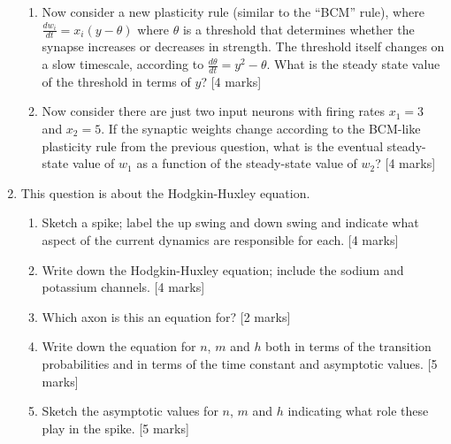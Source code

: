 \documentclass[a4paper,12pt]{article}
\newif\ifsoln
\begin{document}
\begin{enumerate}
\begin{enumerate}
\item Now consider a new plasticity rule (similar to the ``BCM'' rule), where $\frac{dw_i}{dt} = x_i(y-\theta)$ where $\theta$ is a threshold that determines whether the synapse increases or decreases in strength. The threshold itself changes on a slow timescale, according to $\frac{d \theta}{dt} = y^2 - \theta$. What is the steady state value of the threshold in terms of $y$? [4 marks]

\item Now consider there are just two input neurons with firing rates $x_1 = 3$ and $x_2 = 5$. If the synaptic weights change according to the BCM-like plasticity rule from the previous question, what is the eventual steady-state value of $w_1$ as a function of the steady-state value of $w_2$? [4 marks]
\end{enumerate}

\ifsoln Solution:  To follow soon.\fi

\item This question is about the Hodgkin-Huxley equation.

\begin{enumerate}

\item Sketch a spike; label the up swing and down swing and indicate
  what aspect of the current dynamics are responsible for each. [4 marks]

\item Write down the Hodgkin-Huxley equation; include the sodium and potassium channels. [4 marks]

\item Which axon is this an equation for? [2 marks]

\item Write down the equation for $n$, $m$ and $h$ both in terms of
  the transition probabilities and in terms of the time constant and
  asymptotic values. [5 marks]

\item Sketch the asymptotic values for $n$, $m$ and $h$ indicating
  what role these play in the spike. [5 marks]

\end{enumerate}

\ifsoln Solution:  To follow soon. \fi

\end{enumerate}
\end{document}
